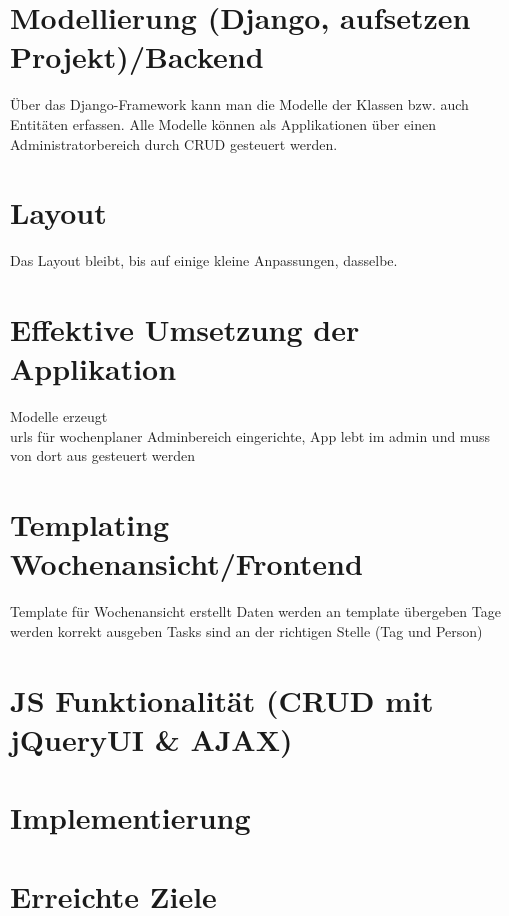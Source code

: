 
\section{Modellierung (Django, aufsetzen Projekt)/Backend }
Über das Django-Framework kann man die Modelle der Klassen bzw. auch Entitäten erfassen.
Alle Modelle können als Applikationen über einen Administratorbereich durch CRUD gesteuert werden.
\section{Layout}
Das Layout bleibt, bis auf einige kleine Anpassungen, dasselbe.
\section{Effektive Umsetzung der Applikation}
Modelle erzeugt\\
urls für wochenplaner
Adminbereich eingerichte, App lebt im admin und muss von dort aus gesteuert werden\\
\section{Templating Wochenansicht/Frontend}
Template für Wochenansicht erstellt
Daten werden an template übergeben
Tage werden korrekt ausgeben
Tasks sind an der richtigen Stelle (Tag und Person)
\section{JS Funktionalität (CRUD mit jQueryUI \& AJAX) }
\section{Implementierung}
\section{Erreichte Ziele}
